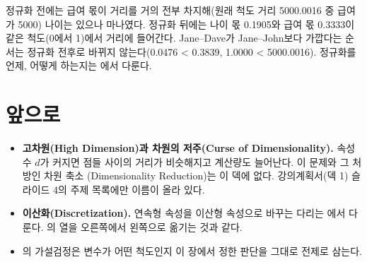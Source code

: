 정규화 전에는 급여 몫이 거리를 거의 전부 차지해(원래 척도 거리
5000.0016 중 급여가 5000) 나이는 있으나 마나였다. 정규화 뒤에는
나이 몫 0.1905와 급여 몫 0.3333이 같은 척도(0에서 1)에서 거리에 들어간다.
Jane–Dave가 Jane–John보다 가깝다는 순서는 정규화 전후로 바뀌지
않는다(0.0476 < 0.3839, 1.0000 < 5000.0016). 정규화를 언제,
어떻게 하는지는 에서 다룬다.

\section{앞으로}
\label{sec:attr-future}

\begin{itemize}
  \item \textbf{고차원(High Dimension)과 차원의 저주(Curse of
        Dimensionality).} 속성 수 $d$가 커지면 점들 사이의 거리가
        비슷해지고 계산량도 늘어난다. 이 문제와 그 처방인 차원 축소
        (Dimensionality Reduction)는 이 덱에 없다. 강의계획서(덱 1)
        슬라이드 4의 주제 목록에만 이름이 올라 있다.
  \item \textbf{이산화(Discretization).} 연속형 속성을 이산형 속성으로 바꾸는 다리는
        에서 다룬다. 
        의 열을 오른쪽에서 왼쪽으로 옮기는 것과 같다.
  \item {}의 가설검정은 변수가 어떤 척도인지 이
        장에서 정한 판단을 그대로 전제로 삼는다.
\end{itemize}
